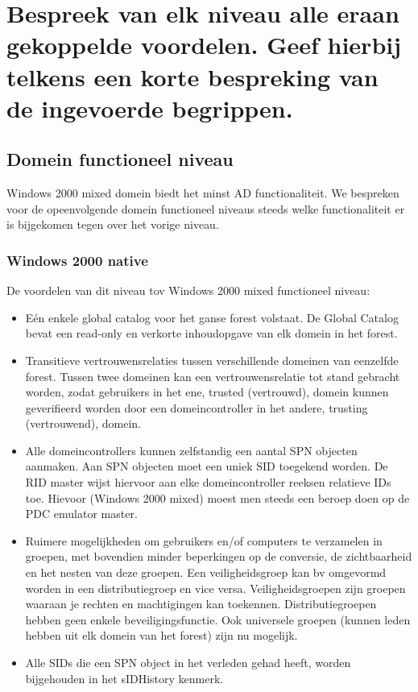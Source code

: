 \section{Bespreek van elk niveau alle eraan gekoppelde voordelen. Geef hierbij
telkens een korte bespreking van de ingevoerde begrippen.}

\subsection{Domein functioneel niveau}

Windows 2000 mixed domein biedt het minst AD functionaliteit. We bespreken voor
de opeenvolgende domein functioneel niveaus steeds welke functionaliteit er is
bijgekomen tegen over het vorige niveau.

\subsubsection{Windows 2000 native}

De voordelen van dit niveau tov Windows 2000 mixed functioneel niveau:
\begin{itemize}
	\item Eén enkele global catalog voor het ganse forest volstaat. De
		Global Catalog bevat een read-only en verkorte inhoudopgave van
		elk domein in het forest.
	\item Transitieve vertrouwensrelaties tussen verschillende domeinen van
		eenzelfde forest. Tussen twee domeinen kan een
		vertrouwensrelatie tot stand gebracht worden, zodat gebruikers
		in het ene, trusted (vertrouwd), domein kunnen geverifieerd
		worden door een domeincontroller in het andere, trusting
		(vertrouwend), domein.
	\item Alle domeincontrollers kunnen zelfstandig een aantal SPN objecten
		aanmaken. Aan SPN objecten moet een uniek SID toegekend worden.
		De RID master wijst hiervoor aan elke domeincontroller reeksen
		relatieve IDs toe. Hievoor (Windows 2000 mixed) moest men steeds
		een beroep doen op de PDC emulator master.
	\item Ruimere mogelijkheden om gebruikers en/of computers te verzamelen
		in groepen, met bovendien minder beperkingen op de conversie, de
		zichtbaarheid en het nesten van deze groepen. Een
		veiligheidsgroep kan bv omgevormd worden in een distributiegroep
		en vice versa. Veiligheidsgroepen zijn groepen waaraan je
		rechten en machtigingen kan toekennen. Distributiegroepen hebben
		geen enkele beveiligingsfunctie. Ook universele groepen (kunnen
		leden hebben uit elk domein van het forest) zijn nu mogelijk.
	\item Alle SIDs die een SPN object in het verleden gehad heeft, worden
		bijgehouden in het sIDHistory kenmerk.
\end{itemize}

